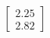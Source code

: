 \documentclass[preview]{standalone}
\begin{document}
\begin{align*}
\begin{bmatrix} 2.25 \\ 2.82 \end{bmatrix}
\end{align*}
\end{document}
